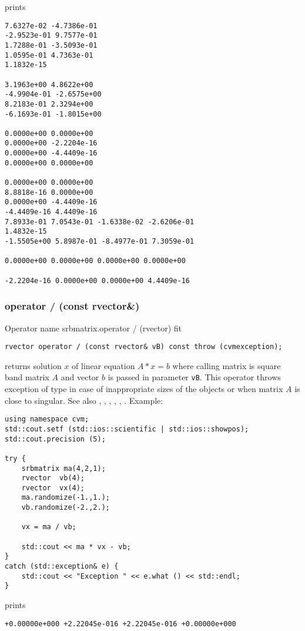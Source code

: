 prints
\begin{Verbatim}
7.6327e-02 -4.7386e-01
-2.9523e-01 9.7577e-01
1.7288e-01 -3.5093e-01
1.0595e-01 4.7363e-01
1.1832e-15

3.1963e+00 4.8622e+00
-4.9904e-01 -2.6575e+00
8.2183e-01 2.3294e+00
-6.1693e-01 -1.8015e+00

0.0000e+00 0.0000e+00
0.0000e+00 -2.2204e-16
0.0000e+00 -4.4409e-16
0.0000e+00 0.0000e+00

0.0000e+00 0.0000e+00
8.8818e-16 0.0000e+00
0.0000e+00 -4.4409e-16
-4.4409e-16 4.4409e-16
7.8933e-01 7.0543e-01 -1.6338e-02 -2.6206e-01
1.4832e-15
-1.5505e+00 5.8987e-01 -8.4977e-01 7.3059e-01

0.0000e+00 0.0000e+00 0.0000e+00 0.0000e+00

-2.2204e-16 0.0000e+00 0.0000e+00 4.4409e-16
\end{Verbatim}
\newpage


\subsubsection{operator / (const rvector\&)}
Operator%
\pdfdest name {srbmatrix.operator / (rvector)} fit
\begin{verbatim}
rvector operator / (const rvector& vB) const throw (cvmexception);
\end{verbatim}
returns solution $x$ of linear equation
$A*x=b$ where calling matrix is square band matrix $A$
and vector $b$ is passed in parameter \verb"vB".
This operator throws exception 
of type 
in case of inappropriate sizes
of the objects or when  matrix $A$ is close to singular.
See also , 
, 
, 
, , .
Example:
\begin{Verbatim}
using namespace cvm;
std::cout.setf (std::ios::scientific | std::ios::showpos);
std::cout.precision (5);

try {
    srbmatrix ma(4,2,1);
    rvector  vb(4);
    rvector  vx(4);
    ma.randomize(-1.,1.);
    vb.randomize(-2.,2.);

    vx = ma / vb;

    std::cout << ma * vx - vb;
}
catch (std::exception& e) {
    std::cout << "Exception " << e.what () << std::endl;
}
\end{Verbatim}
prints
\begin{Verbatim}
+0.00000e+000 +2.22045e-016 +2.22045e-016 +0.00000e+000
\end{Verbatim}
\newpage




